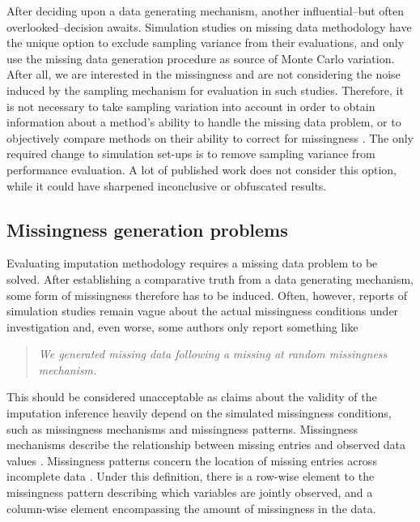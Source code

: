 \documentclass[bimj,fleqn]{w-art}
\begin{document}
After deciding upon a data generating mechanism, another influential--but often overlooked--decision awaits. Simulation studies on missing data methodology have the unique option to exclude sampling variance from their evaluations, and only use the missing data generation procedure as source of Monte Carlo variation. After all, we are interested in the missingness and are not considering the noise induced by the sampling mechanism for evaluation in such studies. Therefore, it is not necessary to take sampling variation into account in order to obtain information about a method's ability to handle the missing data problem, or to objectively compare methods on their ability to correct for missingness \citep[see for a detailed discussion][]{vink14}. The only required change to simulation set-ups is to remove sampling variance from performance evaluation. A lot of published work does not consider this option, while it could have sharpened inconclusive or obfuscated results.  




\subsection{Missingness generation problems}

Evaluating imputation methodology requires a missing data problem to be solved. After establishing a comparative truth from a data generating mechanism, some form of missingness therefore has to be induced. Often, however, reports of simulation studies remain vague about the actual missingness conditions under investigation and, even worse, some authors only report something like
\begin{quote}
\textit{We generated missing data following a missing at random missingness mechanism.}
\end{quote}
This should be considered unacceptable as claims about the validity of the imputation inference heavily depend on the simulated missingness conditions, such as missingness mechanisms and missingness patterns. Missingness mechanisms describe the relationship between missing entries and observed data values \citep[generally categorized into MCAR, MAR and MNAR mechanisms c.f.][see Table \ref{table:mech}]{rubi76}.  Missingness patterns concern the location of missing entries across incomplete data \citep[][p. 8]{litt20}. Under this definition, there is a row-wise element to the missingness pattern describing which variables are jointly observed, and a column-wise element encompassing the amount of missingness in the data. 
\end{document}
